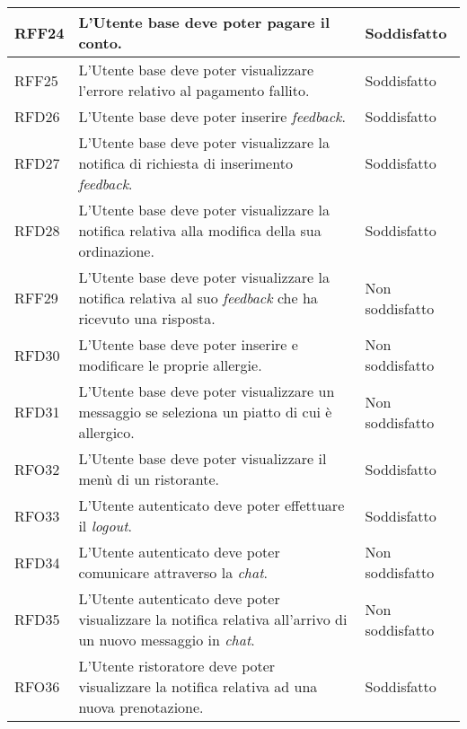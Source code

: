 \begin{longtable}{|l|p{}|p{3cm}|}
	\hline
	RFF24       & L'Utente base deve poter pagare il conto.                                                                                    & Soddisfatto     \\
	\hline
	RFF25       & L'Utente base deve poter visualizzare l'errore relativo al pagamento fallito.                                                & Soddisfatto     \\
	\hline
	RFD26       & L'Utente base deve poter inserire \textit{feedback}.                                                                         & Soddisfatto     \\
	\hline
	RFD27       & L'Utente base deve poter visualizzare la notifica di richiesta di inserimento \textit{feedback}.                             & Soddisfatto     \\
	\hline
	RFD28       & L'Utente base deve poter visualizzare la notifica relativa alla modifica della sua ordinazione.                              & Soddisfatto     \\
	\hline
	RFF29       & L'Utente base deve poter visualizzare la notifica relativa al suo \textit{feedback} che ha ricevuto una risposta.            & Non soddisfatto \\
	\hline
	RFD30       & L'Utente base deve poter inserire e modificare le proprie allergie.                                                          & Non soddisfatto \\
	\hline
	RFD31       & L'Utente base deve poter visualizzare un messaggio se seleziona un piatto di cui è allergico.                                & Non soddisfatto \\
	\hline
	RFO32       & L'Utente base deve poter visualizzare il menù di un ristorante.                                                              & Soddisfatto     \\
	\hline
	RFO33       & L'Utente autenticato deve poter effettuare il \textit{logout}.                                                               & Soddisfatto     \\
	\hline
	RFD34       & L'Utente autenticato deve poter comunicare attraverso la \textit{chat}.                                                      & Non soddisfatto \\
	\hline
	RFD35       & L'Utente autenticato deve poter visualizzare la notifica relativa all'arrivo di un nuovo messaggio in \textit{chat}.         & Non soddisfatto \\
	\hline
	RFO36       & L'Utente ristoratore deve poter visualizzare la notifica relativa ad una nuova prenotazione.                                 & Soddisfatto     \\

\end{longtable}
